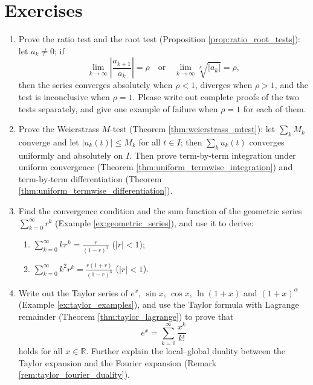 \section*{Exercises}

\begin{enumerate}[leftmargin=3em, label=\textbf{Exercise \arabic*}]
    \item Prove the ratio test and the root test (Proposition \ref{prop:ratio_root_tests}):
    let $a_k\neq0$; if
    \[
    \lim_{k\to\infty}\left|\frac{a_{k+1}}{a_k}\right|=\rho
    \quad\text{or}\quad
    \lim_{k\to\infty}\sqrt[k]{|a_k|}=\rho,
    \]
    then the series converges absolutely when $\rho<1$, diverges when $\rho>1$, and the test is inconclusive when $\rho=1$.
    Please write out complete proofs of the two tests separately, and give one example of failure when $\rho=1$ for each of them.

    \item Prove the Weierstrass $M$-test (Theorem \ref{thm:weierstrass_mtest}):
    let $\sum_k M_k$ converge and let $|u_k(t)|\le M_k$ for all $t\in I$;
    then $\sum_k u_k(t)$ converges uniformly and absolutely on $I$.
    Then prove term-by-term integration under uniform convergence (Theorem \ref{thm:uniform_termwise_integration}) and term-by-term differentiation
    (Theorem \ref{thm:uniform_termwise_differentiation}).

    \item Find the convergence condition and the sum function of the geometric series $\sum_{k=0}^{\infty}r^k$ (Example \ref{ex:geometric_series}),
    and use it to derive:
    \begin{enumerate}[label=(\roman*)]
        \item $\displaystyle \sum_{k=0}^{\infty}kr^k=\frac{r}{(1-r)^2}$ ($|r|<1$);
        \item $\displaystyle \sum_{k=0}^{\infty}k^2r^k=\frac{r(1+r)}{(1-r)^3}$ ($|r|<1$).
    \end{enumerate}

    \item Write out the Taylor series of $e^x$, $\sin x$, $\cos x$, $\ln(1+x)$ and $(1+x)^\alpha$
    (Example \ref{ex:taylor_examples}), and use the Taylor formula with Lagrange remainder
    (Theorem \ref{thm:taylor_lagrange}) to prove that
    \[
    e^x=\sum_{k=0}^{\infty}\frac{x^k}{k!}
    \]
    holds for all $x\in\mathbb{R}$.
    Further explain the local--global duality between the Taylor expansion and the Fourier expansion (Remark \ref{rem:taylor_fourier_duality}).


\end{enumerate}
